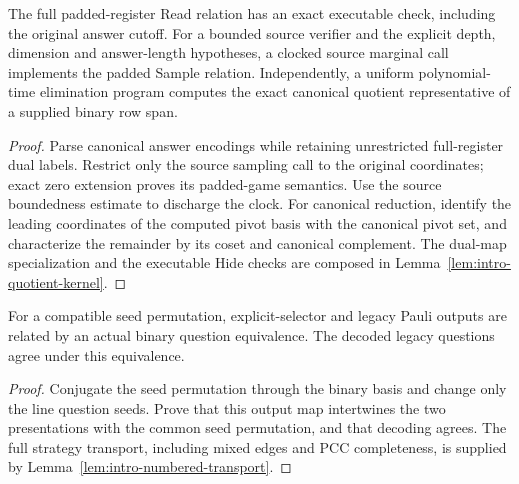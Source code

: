 \begin{lemma}
\label{lem:intro-executable-padded-auxiliary}
\leanok
The full padded-register Read relation has an exact executable check,
including the original answer cutoff. For a bounded source verifier and
the explicit depth, dimension and answer-length hypotheses, a clocked
source marginal call implements the padded Sample relation. Independently,
a uniform polynomial-time elimination program computes the exact canonical
quotient representative of a supplied binary row span.
\end{lemma}
\begin{proof}
\leanok
Parse canonical answer encodings while retaining unrestricted full-register
dual labels. Restrict only the source sampling call to the original
coordinates; exact zero extension proves its padded-game semantics.
Use the source boundedness estimate to discharge the clock.
For canonical reduction, identify the leading coordinates of the computed
pivot basis with the canonical pivot set, and characterize the remainder
by its coset and canonical complement. The dual-map specialization and
the executable Hide checks are composed in
Lemma~\ref{lem:intro-quotient-kernel}.
\end{proof}

\begin{lemma}
\label{lem:intro-explicit-selector-questions}
\leanok
For a compatible seed permutation, explicit-selector and legacy Pauli
outputs are related by an actual binary question equivalence. The decoded
legacy questions agree under this equivalence.
\end{lemma}
\begin{proof}
\leanok
Conjugate the seed permutation through the binary basis and change only
the line question seeds. Prove that this output map intertwines the two
presentations with the common seed permutation, and that decoding agrees.
The full strategy transport, including mixed edges and PCC completeness,
is supplied by Lemma~\ref{lem:intro-numbered-transport}.
\end{proof}

